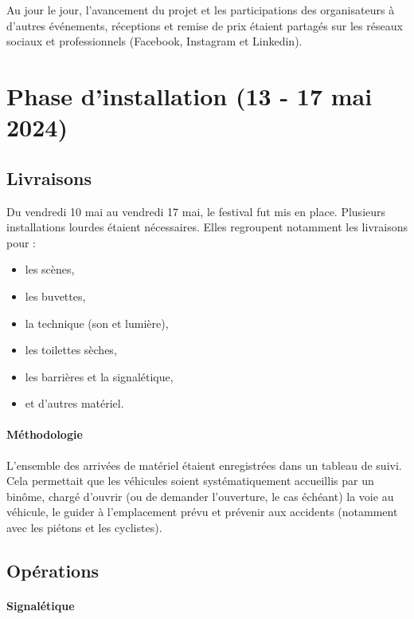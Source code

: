\documentclass[12pt,a4paper]{report}
\begin{document}
Au jour le jour, l’avancement du projet et les participations des organisateurs à d’autres événements, réceptions et remise de prix étaient partagés sur les réseaux sociaux et professionnels (Facebook, Instagram et Linkedin).

\section{Phase d'installation (13 - 17 mai 2024)}

\subsection{Livraisons}

Du vendredi 10 mai au vendredi 17 mai, le festival fut mis en place. Plusieurs installations lourdes étaient nécessaires. Elles regroupent notamment les livraisons pour : 
\begin{itemize}
\item les scènes,
\item les buvettes,
\item la technique (son et lumière),
\item les toilettes sèches, 
\item les barrières et la signalétique,
\item et d'autres matériel.
\end{itemize}

\paragraph{Méthodologie}

L'ensemble des arrivées de matériel étaient enregistrées dans un tableau de suivi. Cela permettait que les véhicules soient systématiquement accueillis par un binôme, chargé d'ouvrir (ou de demander l'ouverture, le cas échéant) la voie au véhicule, le guider à l'emplacement prévu et prévenir aux accidents (notamment avec les piétons et les cyclistes).

\subsection{Opérations}

\paragraph{Signalétique}
\end{document}
